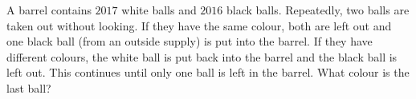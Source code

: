 A barrel contains $2017$ white balls and $2016$ black balls. Repeatedly, two balls are taken out without looking. If they have the same colour, both are left out and one black ball (from an outside supply) is put into the barrel. If they have different colours, the white ball is put back into the barrel and the black ball is left out. This continues until only one ball is left in the barrel. What colour is the last ball?

